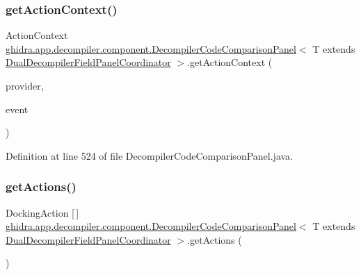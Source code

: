 \subsubsection{\texorpdfstring{getActionContext()}{getActionContext()}}
{\footnotesize\ttfamily Action\+Context \mbox{\hyperlink{classghidra_1_1app_1_1decompiler_1_1component_1_1_decompiler_code_comparison_panel}{ghidra.\+app.\+decompiler.\+component.\+Decompiler\+Code\+Comparison\+Panel}}$<$ T extends \mbox{\hyperlink{classghidra_1_1app_1_1decompiler_1_1component_1_1_dual_decompiler_field_panel_coordinator}{Dual\+Decompiler\+Field\+Panel\+Coordinator}} $>$.get\+Action\+Context (\begin{DoxyParamCaption}\item[{Component\+Provider}]{provider,  }\item[{Mouse\+Event}]{event }\end{DoxyParamCaption})\hspace{0.3cm}{\ttfamily [inline]}}



Definition at line 524 of file Decompiler\+Code\+Comparison\+Panel.\+java.

\mbox{\label{classghidra_1_1app_1_1decompiler_1_1component_1_1_decompiler_code_comparison_panel_a059de6f337d98bd8c891033186ff7229}} 
\subsubsection{\texorpdfstring{getActions()}{getActions()}}
{\footnotesize\ttfamily Docking\+Action \mbox{[}$\,$\mbox{]} \mbox{\hyperlink{classghidra_1_1app_1_1decompiler_1_1component_1_1_decompiler_code_comparison_panel}{ghidra.\+app.\+decompiler.\+component.\+Decompiler\+Code\+Comparison\+Panel}}$<$ T extends \mbox{\hyperlink{classghidra_1_1app_1_1decompiler_1_1component_1_1_dual_decompiler_field_panel_coordinator}{Dual\+Decompiler\+Field\+Panel\+Coordinator}} $>$.get\+Actions (\begin{DoxyParamCaption}{ }\end{DoxyParamCaption})\hspace{0.3cm}{\ttfamily [inline]}}



